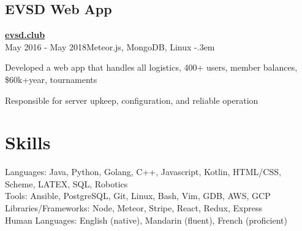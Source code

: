 \documentclass{article}
\let\olditemize=\itemize \let\endolditemize=\enditemize
\renewenvironment{itemize}{\olditemize[topsep=0em] \itemsep-.3em}{\endolditemize}
\newcommand{\myhref}[1]{\href{https://#1}{#1}}
\newcommand{\entry}[3]{\quad\textbf{#1}\\#2\qquad#3}
\begin{document}
\subsection{EVSD Web App}
\entry{\myhref{evsd.club}}{May 2016 - May 2018}{Meteor.js, MongoDB, Linux}
\begin{itemize}
  \item Developed a web app that handles all logistics, 400+ users, member balances,
    \$60k+year, tournaments
  \item Responsible for server upkeep, configuration, and reliable operation
\end{itemize}


\section{Skills}
Languages:
  Java, Python, Golang, C++, Javascript, Kotlin, HTML/CSS, Scheme, LATEX, SQL, Robotics \\
Tools:
  Ansible, PostgreSQL, Git, Linux, Bash, Vim, GDB, AWS, GCP \\
Libraries/Frameworks:
  Node, Meteor, Stripe, React, Redux, Express \\
Human Languages:
  English (native), Mandarin (fluent), French (proficient)
\end{document}
